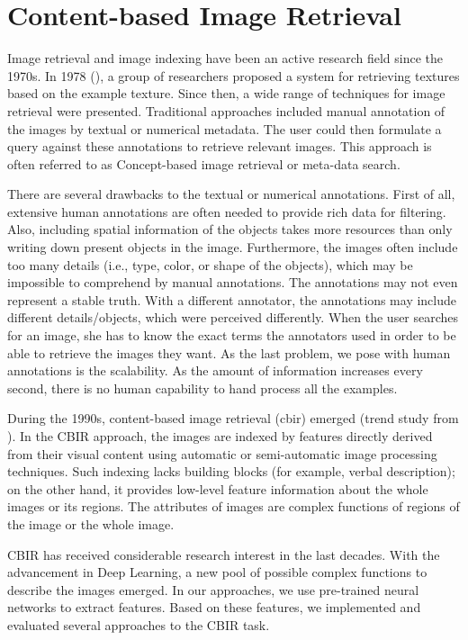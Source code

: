 \chapter{Content-based Image Retrieval}
\label{ch:preliminaries}

Image retrieval and image indexing have been an active research field since the 1970s. In 1978 (\cite{tamura1978textural}), a group of researchers proposed a system for retrieving textures based on the example texture. Since then, a wide range of techniques for image retrieval were presented. Traditional approaches included manual annotation of the images by textual or numerical metadata. The user could then formulate a query against these annotations to retrieve relevant images. This approach is often referred to as Concept-based image retrieval or meta-data search.

There are several drawbacks to the textual or numerical annotations. First of all, extensive human annotations are often needed to provide rich data for filtering. Also, including spatial information of the objects takes more resources than only writing down present objects in the image. Furthermore, the images often include too many details (i.e., type, color, or shape of the objects), which may be impossible to comprehend by manual annotations.  The annotations may not even represent a stable truth. With a different annotator, the annotations may include different details/objects, which were perceived differently. When the user searches for an image, she has to know the exact terms the annotators used in order to be able to retrieve the images they want. As the last problem, we pose with human annotations is the scalability. As the amount of information increases every second, there is no human capability to hand process all the examples.

During the 1990s, content-based image retrieval (\acrshort{cbir}) emerged (trend study from \cite{datta2008image}). In the CBIR approach, the images are indexed by features directly derived from their visual content using automatic or semi-automatic image processing techniques. Such indexing lacks building blocks (for example, verbal description); on the other hand, it provides low-level feature information about the whole images or its regions. The attributes of images are complex functions of regions of the image or the whole image.

CBIR has received considerable research interest in the last decades. With the advancement in Deep Learning, a new pool of possible complex functions to describe the images emerged. In our approaches, we use pre-trained neural networks to extract features. Based on these features, we implemented and evaluated several approaches to the CBIR task.

